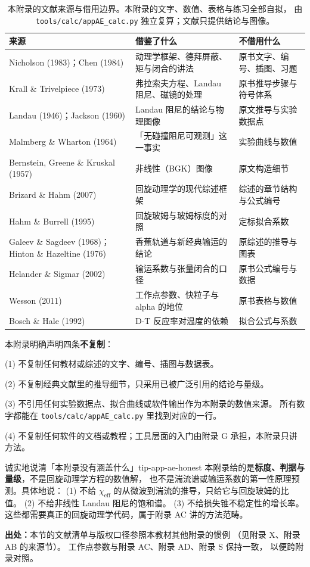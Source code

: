 \begin{table}[htbp]
\centering
\small
\caption{本附录的文献来源与借用边界。本附录的文字、数值、表格与练习全部自拟，
由 \texttt{tools/\allowbreak{}calc/\allowbreak{}appAE\_calc.py} 独立复算；文献只提供结论与图像。}
\label{tab:app-ae-source}
\begin{tabular}{p{4.0cm}p{4.4cm}p{5.0cm}}
\toprule
来源 & 借鉴了什么 & 不借用什么 \\
\midrule
Nicholson (1983)；Chen (1984) & 动理学框架、德拜屏蔽、矩与闭合的讲法 & 原书文字、编号、插图、习题 \\
Krall \& Trivelpiece (1973) & 弗拉索夫方程、Landau 阻尼、磁镜的处理 & 原书推导步骤与符号体系 \\
Landau (1946)；Jackson (1960) & Landau 阻尼的结论与物理图像 & 原文推导与实验数据点 \\
Malmberg \& Wharton (1964) & 「无碰撞阻尼可观测」这一事实 & 实验曲线与数值 \\
Bernstein, Greene \& Kruskal (1957) & 非线性（BGK）图像 & 原文构造细节 \\
Brizard \& Hahm (2007) & 回旋动理学的现代综述框架 & 综述的章节结构与公式编号 \\
Hahm \& Burrell (1995) & 回旋玻姆与玻姆标度的对照 & 定标拟合系数 \\
Galeev \& Sagdeev (1968)；Hinton \& Hazeltine (1976) & 香蕉轨道与新经典输运的结论 & 原综述的推导与图表 \\
Helander \& Sigmar (2002) & 输运系数与张量闭合的口径 & 原书公式编号与数据 \\
Wesson (2011) & 工作点参数、快粒子与 \mbox{alpha} 的地位 & 原书表格与数值 \\
Bosch \& Hale (1992) & D-T 反应率对温度的依赖 & 拟合公式与系数 \\
\bottomrule
\end{tabular}

\end{table}

本附录明确声明四条\textbf{不复制}：

(1) 不复制任何教材或综述的文字、编号、插图与数据表。

(2) 不复制经典文献里的推导细节，只采用已被广泛引用的结论与量级。

(3) 不引用任何实验数据点、拟合曲线或软件输出作为本附录的数值来源。
所有数字都能在 \texttt{tools/\allowbreak{}calc/\allowbreak{}appAE\_calc.py} 里找到对应的一行。

(4) 不复制任何软件的文档或教程；工具层面的入门由附录 G 承担，本附录只讲方法。

\begin{tip}{诚实地说清「本附录没有涵盖什么」}{tip-app-ae-honest}
本附录给的是\textbf{标度、判据与量级}，不是回旋动理学方程的数值解，
也不是湍流谱或输运系数的第一性原理预测。具体地说：
(1) 不给 $\chi_{\mathrm{eff}}$ 的从微波到湍流的推导，只给它与回旋玻姆的比值。
(2) 不给非线性 Landau 阻尼的饱和谱。
(3) 不给损失锥不稳定性的增长率。
这些都需要真正的回旋动理学代码，属于附录 AC 讲的方法范畴。
\end{tip}

\textbf{出处：}本节的文献清单与版权口径参照本教材其他附录的惯例
（见附录 X、附录 AB 的来源节）。
工作点参数与附录 AC、附录 AD、附录 S 保持一致，
以便跨附录对照。
\endgroup